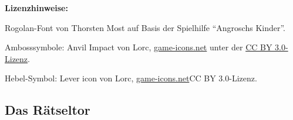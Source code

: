 \documentclass[openright]{Ilaris}
\begin{document}
\vfill
\footnotesize
\textbf{Lizenzhinweise:}
\label{lizenz}
\bigskip

Rogolan-Font von Thorsten Most auf Basis der Spielhilfe \enquote{Angroschs Kinder}.

Ambosssymbole: Anvil Impact von Lorc, \href{https://game-icons.net/1x1/lorc/anvil-impact.html}{game-icons.net} unter der \href{https://creativecommons.org/licenses/by/3.0/}{CC BY 3.0-Lizenz}.

Hebel-Symbol: Lever icon von Lorc, \href{https://game-icons.net/1x1/lorc/lever.html}{game-icons.net}{CC BY 3.0-Lizenz}.
\normalsize
\newpage

\subsection{Das Rätseltor}
\label{raetsel}
\newpage
{}
\newpage



%


\end{document}
